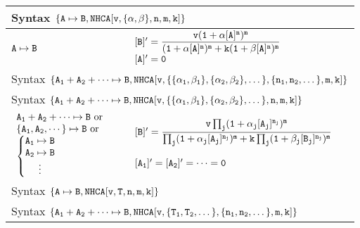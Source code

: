 \documentclass[12pt,letterpaper]{article}
\begin{document}
\begin{center}
\begin{tabular}{|p{1.5in}|p{4.5in}|}
\hline
\multicolumn{2}{|l|}{Syntax 
$\{\tt A\mapsto B, NHCA[v, \{\alpha, \beta\}, n, m, k]\}$
}
\\ \hline
${\tt A \mapsto B}$ &
$\begin{array}{l}
{\tt [B]'=\dfrac{v(1+\alpha [A]^n)^m}{(1+\alpha [A]^n)^m + k (1+\beta [A]^n)^m}}\\
{\tt [A]'=0}
\end{array}
$
\\\hline
\multicolumn{2}{|l|}{Syntax 
$\{\tt A_1 + A_2 + \cdots \mapsto B, NHCA[v, \{\{\alpha_1,\beta_1\}, \{\alpha_2,\beta_2\},\dots\}, \{n_1,n_2,\dots\}, m, k]\}$
}\\
\multicolumn{2}{|l|}{Syntax 
$\{\tt A_1 + A_2 + \cdots \mapsto B, NHCA[v, \{\{\alpha_1,\beta_1\}, \{\alpha_2,\beta_2\},\dots\}, n, m, k]\}$
}
\\\hline
$
\begin{array}{l}
  {\tt A_1+A_2+\cdots \mapsto B} \text{ or }\\
  {\tt \{A_1, A_2, \cdots\} \mapsto B} \text{ or } \\
  \left\{
    \begin{matrix}
      {\tt A_1 \mapsto B}\\
      {\tt A_2 \mapsto B}\\
      {\tt \vdots}
    \end{matrix}
  \right.
\end{array}
$
&
$
\begin{array}{l}
{\tt
[B]'=\dfrac{v\prod_j(1+\alpha_j [A_j]^{n_j})^m}
{\prod_j(1+\alpha_j [A_j]^{n_j})^m + k \prod_j(1+\beta_j [B_j]^{n_j})^m}
}
\\ \\
{\tt [A_1]'=[A_2]' = \cdots = 0}
\end{array}
$
\\\hline
\multicolumn{2}{|l|}{Syntax 
$\{\tt A \mapsto B, NHCA[v,T, n, m, k]\}$
}\\ 
\multicolumn{2}{|l|}{Syntax 
$\{\tt A_1+A_2+\cdots \mapsto B, NHCA[v,\{T_1,T_2,\dots\}, \{n_1,n_2,\dots\}, m, k]\}$
}\\ 



\end{tabular}
\end{center}
\end{document}
